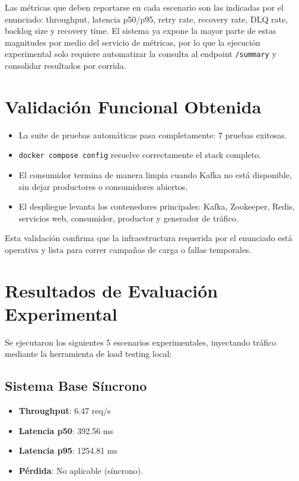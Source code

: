 \documentclass[letter,12pt]{article}
\begin{document}
Las m\'etricas que deben reportarse en cada escenario son las indicadas por el enunciado: throughput, latencia p50/p95, retry rate, recovery rate, DLQ rate, backlog size y recovery time. El sistema ya expone la mayor parte de estas magnitudes por medio del servicio de m\'etricas, por lo que la ejecuci\'on experimental solo requiere automatizar la consulta al endpoint \texttt{/summary} y consolidar resultados por corrida.

\section{Validaci\'on Funcional Obtenida}

\begin{itemize}
    \item La suite de pruebas autom\'aticas pasa completamente: 7 pruebas exitosas.
    \item \texttt{docker compose config} resuelve correctamente el stack completo.
    \item El consumidor termina de manera limpia cuando Kafka no est\'a disponible, sin dejar productores o consumidores abiertos.
    \item El despliegue levanta los contenedores principales: Kafka, Zookeeper, Redis, servicios web, consumidor, productor y generador de tr\'afico.
\end{itemize}

Esta validaci\'on confirma que la infraestructura requerida por el enunciado est\'a operativa y lista para correr campa\~nas de carga o fallas temporales.

\section{Resultados de Evaluaci\'on Experimental}

Se ejecutaron los siguientes 5 escenarios experimentales, inyectando tr\'afico mediante la herramienta de load testing local:

\subsection{Sistema Base S\'incrono}
\begin{itemize}
    \item \textbf{Throughput}: 6.47 req/s
    \item \textbf{Latencia p50}: 392.56 ms
    \item \textbf{Latencia p95}: 1254.81 ms
    \item \textbf{P\'erdida}: No aplicable (s\'incrono).
\end{itemize}
\end{document}
